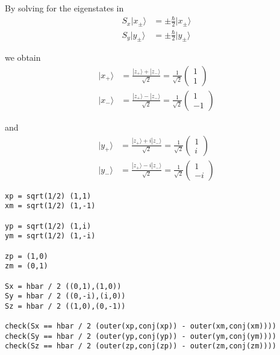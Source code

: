 By solving for the eigenstates in
\begin{align*}
S_x|x_\pm\rangle&=\pm\tfrac{\hbar}{2}|x_\pm\rangle
\\
S_y|y_\pm\rangle&=\pm\tfrac{\hbar}{2}|y_\pm\rangle
\end{align*}

we obtain
\begin{align*}
|x_+\rangle&=\frac{|z_+\rangle+|z_-\rangle}{\sqrt2}=\frac{1}{\sqrt2}\begin{pmatrix}1\\1\end{pmatrix}
\\
|x_-\rangle&=\frac{|z_+\rangle-|z_-\rangle}{\sqrt2}=\frac{1}{\sqrt2}\begin{pmatrix}1\\-1\end{pmatrix}
\end{align*}

and
\begin{align*}
|y_+\rangle&=\frac{|z_+\rangle+i|z_-\rangle}{\sqrt2}=\frac{1}{\sqrt2}\begin{pmatrix}1\\i\end{pmatrix}
\\
|y_-\rangle&=\frac{|z_+\rangle-i|z_-\rangle}{\sqrt2}=\frac{1}{\sqrt2}\begin{pmatrix}1\\-i\end{pmatrix}
\end{align*}

\newpage
{}

{\footnotesize\begin{verbatim}
xp = sqrt(1/2) (1,1)
xm = sqrt(1/2) (1,-1)

yp = sqrt(1/2) (1,i)
ym = sqrt(1/2) (1,-i)

zp = (1,0)
zm = (0,1)

Sx = hbar / 2 ((0,1),(1,0))
Sy = hbar / 2 ((0,-i),(i,0))
Sz = hbar / 2 ((1,0),(0,-1))

check(Sx == hbar / 2 (outer(xp,conj(xp)) - outer(xm,conj(xm))))
check(Sy == hbar / 2 (outer(yp,conj(yp)) - outer(ym,conj(ym))))
check(Sz == hbar / 2 (outer(zp,conj(zp)) - outer(zm,conj(zm))))
\end{verbatim}}

